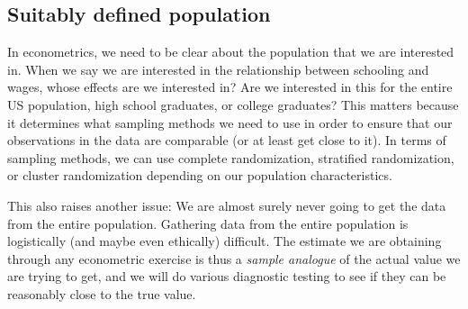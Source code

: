 \documentclass[12pt]{article}
\theoremstyle{definition}
\theoremstyle{property}
\theoremstyle{assumption}
\theoremstyle{example}
\theoremstyle{comment}
\begin{document}
\subsection{Suitably defined population}
In econometrics, we need to be clear about the population that we are interested in. When we say we are interested in the relationship between schooling and wages, whose effects are we interested in? Are we interested in this for the entire US population, high school graduates, or college graduates? This matters because it determines what sampling methods we need to use in order to ensure that our observations in the data are comparable (or at least get close to it). In terms of sampling methods, we can use complete randomization, stratified randomization, or cluster randomization depending on our population characteristics.\par
This also raises another issue: We are almost surely never going to get the data from the entire population. Gathering data from the entire population is logistically (and maybe even ethically) difficult. The estimate we are obtaining through any econometric exercise is thus a \textit{sample analogue} of the actual value we are trying to get, and we will do various diagnostic testing to see if they can be reasonably close to the true value. 
\end{document}
